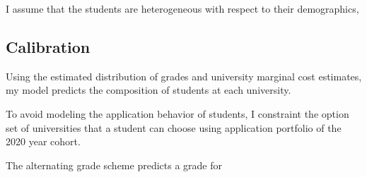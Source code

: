 I assume that the students are heterogeneous with respect to their demographics, 

\subsection{Calibration}
Using the estimated distribution of grades and university marginal cost estimates, my model predicts the composition of students at each university. 

To avoid modeling the application behavior of students, I constraint the option set of universities that a student can choose using application portfolio of the 2020 year cohort. 

The alternating grade scheme predicts a grade for 